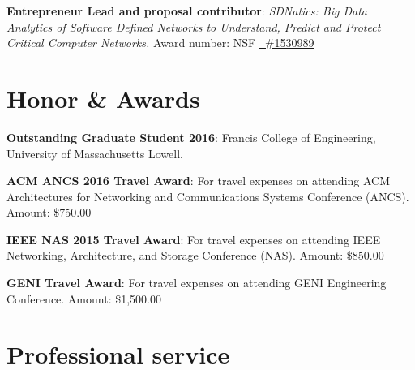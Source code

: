 \documentclass[11pt]{moderncv}
\begin{document}
%
{\textbf{Entrepreneur Lead and proposal contributor}: \textit{SDNatics: Big Data Analytics of Software Defined Networks to Understand, Predict and Protect Critical Computer Networks.} \newline
Award number: NSF \href{https://www.nsf.gov/awardsearch/showAward?AWD_ID=1530989}
    {\color{color2}\homepagesymbol~\#1530989} \newline
}

\section{Honor \& Awards}
%
{\textbf{Outstanding Graduate Student 2016}: Francis College of Engineering, University of Massachusetts Lowell.
}

%
{\textbf{ACM ANCS 2016 Travel Award}: For travel expenses on attending ACM Architectures for Networking and Communications Systems Conference (ANCS). \newline
Amount: \$750.00
}

%
{\textbf{IEEE NAS 2015 Travel Award}: For travel expenses on attending IEEE Networking, Architecture, and Storage Conference (NAS). \newline
Amount: \$850.00
}

%
{\textbf{GENI Travel Award}: For travel expenses on attending GENI Engineering Conference. \newline
Amount: \$1,500.00
}

\section{Professional service}
%

%

%

%

%

%
\end{document}
